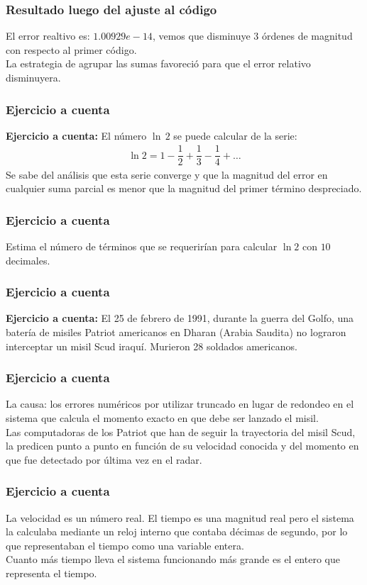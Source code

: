 \documentclass[12pt]{beamer}
\begin{document}
\begin{frame}
\frametitle{Resultado luego del ajuste al código}
El error realtivo es: $1.00929e-14$, vemos que disminuye $3$ órdenes de magnitud con respecto al primer código.
\\
\bigskip
\pause
La estrategia de agrupar las sumas favoreció para que el error relativo disminuyera.
\end{frame}

\begin{frame}
\frametitle{Ejercicio a cuenta}
\textbf{Ejercicio a cuenta: } El número $\ln \, 2$ se puede calcular de la serie:
\begin{align*}
\ln 2 = 1 - \dfrac{1}{2} + \dfrac{1}{3} -\dfrac{1}{4} + \ldots
\end{align*}
Se sabe del análisis que esta serie converge y que la magnitud del error en cualquier suma parcial es menor que la magnitud del primer término despreciado.
\end{frame}
\begin{frame}
\frametitle{Ejercicio a cuenta}
Estima el número de términos que se requerirían para calcular $\ln 2$ con $10$ decimales.
\end{frame}
\begin{frame}
\frametitle{Ejercicio a cuenta}
\textbf{Ejercicio a cuenta: } El 25 de febrero de 1991, durante la guerra del Golfo, una batería de misiles Patriot americanos en Dharan (Arabia Saudita) no lograron interceptar un misil Scud iraquí. Murieron 28 soldados americanos.
\end{frame}
\begin{frame}
\frametitle{Ejercicio a cuenta}
La causa: los errores numéricos por utilizar truncado en lugar de redondeo en el sistema que calcula el momento exacto en que debe ser lanzado el misil.
\\
\bigskip
\pause
Las computadoras de los Patriot que han de seguir la trayectoria del misil Scud, la predicen punto a punto en función de su velocidad conocida y del momento en que fue detectado por última vez en el radar.
\end{frame}
\begin{frame}
\frametitle{Ejercicio a cuenta}
La velocidad es un número real. El tiempo es una magnitud real pero el sistema la calculaba mediante un reloj interno que contaba décimas de segundo, por lo que representaban el tiempo como una variable entera.
\\
\bigskip
\pause
Cuanto más tiempo lleva el sistema funcionando más grande es el entero que representa el tiempo.
\end{frame}
\end{document}
